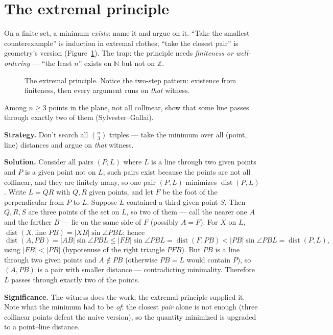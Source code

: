 \section{The extremal principle}
On a finite set, a minimum \emph{exists}: name it and argue on it.
``Take the smallest counterexample'' is induction in extremal clothes;
``take the closest pair'' is geometry's version
(Figure~\ref{fig:extremal}). The trap: the principle needs
\emph{finiteness or well-ordering} --- ``the least $n$'' exists on
$\mathbb N$ but not on $\mathbb Z$.
\begin{figure}[ht]\centering

\caption{The extremal principle. Notice the two-step pattern: existence
from finiteness, then every argument runs on \emph{that} witness.}
\label{fig:extremal}
\end{figure}

\begin{example}
Among $n\ge3$ points in the plane, not all collinear, show that some
line passes through exactly two of them (Sylvester--Gallai).

\textbf{Strategy.} Don't search all $\binom n3$ triples --- take the
minimum over all (point, line) distances and argue on \emph{that}
witness.

\textbf{Solution.} Consider all pairs $(P,L)$ where $L$ is a line
through two given points and $P$ is a given point not on $L$; such
pairs exist because the points are not all collinear, and they are
finitely many, so one pair $(P,L)$ minimizes $\operatorname{dist}(P,L)$.
Write $L=QR$ with $Q,R$ given points, and let $F$ be the foot of the
perpendicular from $P$ to $L$. Suppose $L$ contained a third given
point $S$. Then $Q,R,S$ are three points of the set on $L$, so two of
them --- call the nearer one $A$ and the farther $B$ --- lie on the
same side of $F$ (possibly $A=F$). For $X$ on $L$,
$\operatorname{dist}(X,\text{line }PB)=|XB|\sin\angle PBL$; hence
\[
\operatorname{dist}(A,PB)=|AB|\sin\angle PBL
\le|FB|\sin\angle PBL=\operatorname{dist}(F,PB)
<|PB|\sin\angle PBL=\operatorname{dist}(P,L),
\]
using $|FB|<|PB|$ (hypotenuse of the right triangle $PFB$). But $PB$
is a line through two given points and $A\notin PB$ (otherwise
$PB=L$ would contain $P$), so $(A,PB)$ is a pair with smaller
distance --- contradicting minimality. Therefore $L$ passes through
exactly two of the points.

\textbf{Significance.} The witness does the work; the extremal
principle supplied it. Note what the minimum had to be \emph{of}: the
closest \emph{pair} alone is not enough (three collinear points defeat
the naive version), so the quantity minimized is upgraded to a
point--line distance.
\end{example}

